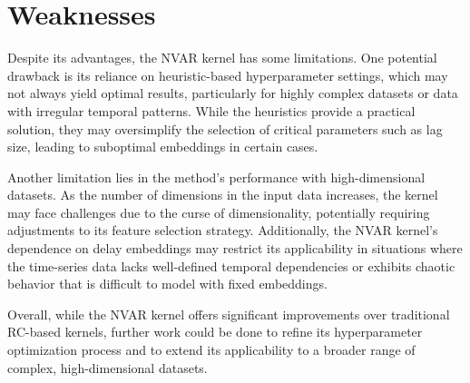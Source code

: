 \section{Weaknesses}

Despite its advantages, the NVAR kernel has some limitations. One potential drawback is its reliance on heuristic-based hyperparameter settings, which may not always yield optimal results, particularly for highly complex datasets or data with irregular temporal patterns. While the heuristics provide a practical solution, they may oversimplify the selection of critical parameters such as lag size, leading to suboptimal embeddings in certain cases.

Another limitation lies in the method's performance with high-dimensional datasets. As the number of dimensions in the input data increases, the kernel may face challenges due to the curse of dimensionality, potentially requiring adjustments to its feature selection strategy. Additionally, the NVAR kernel's dependence on delay embeddings may restrict its applicability in situations where the time-series data lacks well-defined temporal dependencies or exhibits chaotic behavior that is difficult to model with fixed embeddings.

Overall, while the NVAR kernel offers significant improvements over traditional RC-based kernels, further work could be done to refine its hyperparameter optimization process and to extend its applicability to a broader range of complex, high-dimensional datasets.
